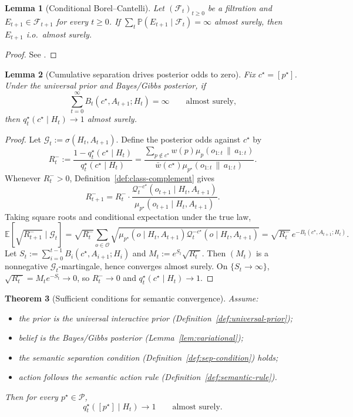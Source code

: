 \documentclass[11pt]{article}
\newtheorem{theorem}{Theorem}[section]
\newtheorem{lemma}[theorem]{Lemma}
\theoremstyle{definition}
\theoremstyle{remark}
\newcommand{\Ocal}{\mathcal{O}}
\newcommand{\Pcal}{\mathcal{P}}
\newcommand{\Qcal}{\mathcal{Q}}
\newcommand{\E}{\mathbb{E}}
\newcommand{\Prob}{\mathbb{P}}
\newcommand{\givena}{\,\|\,}
\begin{document}
\begin{lemma}[Conditional Borel--Cantelli]
\label{lem:conditional-bc}
Let $(\mathcal{F}_t)_{t\ge 0}$ be a filtration and $E_{t+1}\in\mathcal{F}_{t+1}$ for every $t\ge 0$. If $\sum_t\Prob(E_{t+1}\mid\mathcal{F}_t)=\infty$ almost surely, then $E_{t+1}$ i.o.\ almost surely.
\end{lemma}

\begin{proof}
See \citet[Chapter~12]{Williams1991}.
\end{proof}

\begin{lemma}[Cumulative separation drives posterior odds to zero]
\label{lem:contraction}
Fix $c^\star=[p^\star]$. Under the universal prior and Bayes/Gibbs posterior, if
\[
\sum_{t=0}^{\infty}B_t(c^\star,A_{t+1};H_t)=\infty
\qquad
\text{almost surely,}
\]
then $q_t^\star(c^\star\mid H_t)\to 1$ almost surely.
\end{lemma}

\begin{proof}
Let $\mathcal{G}_t:=\sigma(H_t,A_{t+1})$. Define the posterior odds against $c^\star$ by
\[
R_t^-:=\frac{1-q_t^\star(c^\star\mid H_t)}{q_t^\star(c^\star\mid H_t)}
=\frac{\sum_{p\notin c^\star}w(p)\mu_p(o_{1:t}\givena a_{1:t})}
      {\bar w(c^\star)\mu_{p^\star}(o_{1:t}\givena a_{1:t})}.
\]
Whenever $R_t^->0$, Definition~\ref{def:class-complement} gives
\[
R_{t+1}^-=R_t^-\cdot\frac{\Qcal_t^{-c^\star}(o_{t+1}\mid H_t,A_{t+1})}{\mu_{p^\star}(o_{t+1}\mid H_t,A_{t+1})}.
\]
Taking square roots and conditional expectation under the true law,
\[
\E\!\left[\sqrt{R_{t+1}^-}\mid\mathcal{G}_t\right]
=
\sqrt{R_t^-}\sum_{o\in\Ocal}\sqrt{\mu_{p^\star}(o\mid H_t,A_{t+1})\Qcal_t^{-c^\star}(o\mid H_t,A_{t+1})}
=
\sqrt{R_t^-}\,e^{-B_t(c^\star,A_{t+1};H_t)}.
\]
Let $S_t:=\sum_{i=0}^{t-1}B_i(c^\star,A_{i+1};H_i)$ and $M_t:=e^{S_t}\sqrt{R_t^-}$. Then $(M_t)$ is a nonnegative $\mathcal{G}_t$-martingale, hence converges almost surely. On $\{S_t\to\infty\}$, $\sqrt{R_t^-}=M_te^{-S_t}\to 0$, so $R_t^-\to 0$ and $q_t^\star(c^\star\mid H_t)\to 1$.
\end{proof}

\begin{theorem}[Sufficient conditions for semantic convergence]
\label{thm:semantic-convergence}
Assume:
\begin{itemize}
\item[(C1)] the prior is the universal interactive prior (Definition~\ref{def:universal-prior});
\item[(C2)] belief is the Bayes/Gibbs posterior (Lemma~\ref{lem:variational});
\item[(C3)] the semantic separation condition (Definition~\ref{def:sep-condition}) holds;
\item[(C4)] action follows the semantic action rule (Definition~\ref{def:semantic-rule}).
\end{itemize}
Then for every $p^\star\in\Pcal$,
\[
q_t^\star([p^\star]\mid H_t)\longrightarrow 1
\qquad
\text{almost surely.}
\]
\end{theorem}
\end{document}
